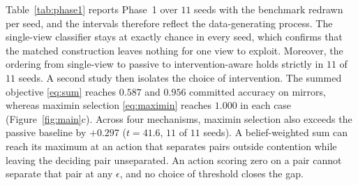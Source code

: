\documentclass{article} %
\theoremstyle{defstyle}
\theoremstyle{plain}
\begin{document}
Table~\ref{tab:phase1} reports Phase~1 over $11$ seeds with the benchmark redrawn per seed, and
the intervals therefore reflect the data-generating process. The single-view classifier stays
at exactly chance in every seed, which confirms that the matched construction leaves nothing
for one view to exploit. Moreover, the ordering from single-view to passive to
intervention-aware holds strictly in $11$ of $11$ seeds. A second study then isolates the
choice of intervention. The summed objective \eqref{eq:sum} reaches $0.587$ and $0.956$
committed accuracy on mirrors, whereas maximin selection \eqref{eq:maximin} reaches $1.000$ in
each case (Figure~\ref{fig:main}c). Across four mechanisms, maximin selection also exceeds the
passive baseline by $+0.297$ ($t = 41.6$, $11$ of $11$ seeds). A belief-weighted sum can reach
its maximum at an action that separates pairs outside contention while leaving the deciding
pair unseparated. An action scoring zero on a pair cannot separate that pair at any $\epsilon$, and no choice of threshold closes the gap.
\end{document}
